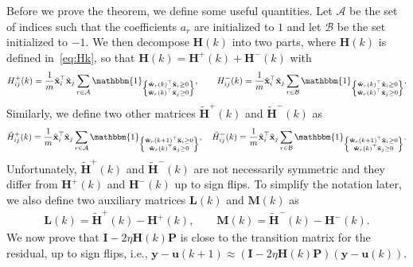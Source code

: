 Before we prove the theorem, we define some useful quantities. Let $\mathcal{A}$ be the set of indices such that the coefficients $a_r$ are initialized to $1$ and let $\mathcal{B}$ be the set initialized to $-1$. We then decompose $\mathbf{H}(k)$ into two parts, where $\mathbf{H}(k)$ is defined in~\cref{eq:Hk}, so that $\mathbf{H}(k) = \mathbf{H}^+(k) + \mathbf{H}^-(k)$ with
\begin{align*}
    H^+_{ij}(k) = \frac{1}{m}\tilde{\mathbf{x}}_i^\top \tilde{\mathbf{x}}_j \sum_{r \in \mathcal{A}} \mathbbm{1}_{\left\{\substack{\tilde{\mathbf{w}}_r(k)^\top \tilde{\mathbf{x}}_i \geq 0\\ \tilde{\mathbf{w}}_r(k)^\top \tilde{\mathbf{x}}_j \geq 0}\right\}}, \qquad 
    H^-_{ij}(k) = \frac{1}{m}\tilde{\mathbf{x}}_i^\top \tilde{\mathbf{x}}_j \sum_{r \in \mathcal{B}} \mathbbm{1}_{\left\{\substack{\tilde{\mathbf{w}}_r(k)^\top \tilde{\mathbf{x}}_i \geq 0\\ \tilde{\mathbf{w}}_r(k)^\top \tilde{\mathbf{x}}_j \geq 0}\right\}}.
\end{align*}
Similarly, we define two other matrices $\tilde {\mathbf{H}}^+(k)$ and $\tilde {\mathbf{H}}^-(k)$ as
\begin{align*}
    \tilde{H}^+_{ij}(k) = \frac{1}{m}\tilde{\mathbf{x}}_i^\top \tilde{\mathbf{x}}_j \sum_{r \in \mathcal{A}} \mathbbm{1}_{\left\{\substack{\tilde{\mathbf{w}}_r(k+1)^\top \tilde{\mathbf{x}}_i \geq 0\\ \tilde{\mathbf{w}}_r(k)^\top \tilde{\mathbf{x}}_j \geq 0}\right\}}, \quad 
    \tilde{H}^-_{ij}(k) = \frac{1}{m}\tilde{\mathbf{x}}_i^\top \tilde{\mathbf{x}}_j \sum_{r \in \mathcal{B}} \mathbbm{1}_{\left\{\substack{\tilde{\mathbf{w}}_r(k+1)^\top \tilde{\mathbf{x}}_i \geq 0\\ \tilde{\mathbf{w}}_r(k)^\top \tilde{\mathbf{x}}_j \geq 0}\right\}}.
\end{align*}
Unfortunately, $\tilde{\mathbf{H}}^+(k)$ and $\tilde{\mathbf{H}}^-(k)$ are not necessarily symmetric and they differ from ${\mathbf{H}}^+(k)$ and ${\mathbf{H}}^-(k)$ up to sign flips. To simplify the notation later, we also define two auxiliary matrices $\mathbf{L}(k)$ and $\mathbf{M}(k)$ as
\begin{align*}
    \mathbf{L}(k) = \tilde{\mathbf{H}}^+(k) - \mathbf{H}^+(k), \qquad \mathbf{M}(k) = \tilde{\mathbf{H}}^-(k) - \mathbf{H}^-(k).
\end{align*}
We now prove that $\mathbf{I} - 2\eta\mathbf{H}(k)\mathbf{P}$ is close to the transition matrix for the residual, up to sign flips, i.e., $\mathbf{y} - \mathbf{u}(k+1) \approx (\mathbf{I} - 2\eta\mathbf{H}(k)\mathbf{P})(\mathbf{y} - \mathbf{u}(k))$. %

